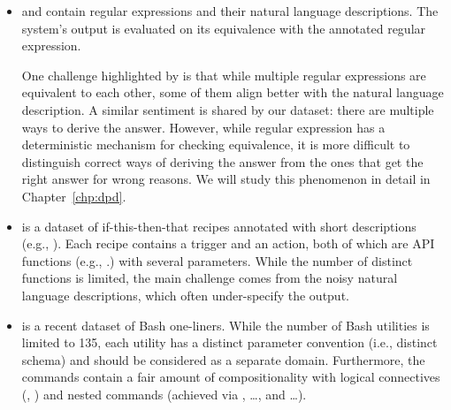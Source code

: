 \begin{itemize}

\item {} \cite{kushman2013regex}
and  \cite{locascio2016regex}
contain regular expressions and 
their natural language descriptions.
The system's output is evaluated on its equivalence with
the annotated regular expression.

One challenge highlighted by \citet{kushman2013regex}
is that while multiple
regular expressions are equivalent to each other,
some of them align better with the
natural language description.
A similar sentiment is shared by our dataset:
there are multiple ways to derive the answer.
However, while regular expression has a deterministic
mechanism for checking equivalence,
it is more difficult to distinguish correct ways
of deriving the answer from the ones that get
the right answer for wrong reasons.
We will study this phenomenon in detail in
Chapter~\ref{chp:dpd}.

\item {} \cite{quirk2015language}
is a dataset of if-this-then-that recipes
annotated with short descriptions
(e.g., ).
Each recipe contains a trigger and an action,
both of which are API functions
(e.g., .)
with several parameters.
While the number of distinct functions is limited,
the main challenge comes from the
noisy natural language descriptions,
which often under-specify the output.

\item {} \cite{lin2018nl2bash}
is a recent dataset of Bash one-liners.
While the number of Bash utilities is limited to 135,
each utility has a distinct parameter convention (i.e., distinct schema)
and should be considered as a separate domain.
Furthermore,
the commands contain a fair amount of compositionality
with logical connectives (\T{\&\&}, \T{||})
and nested commands (achieved via \T{|}, \T{\$(}\dots\T{)}, and \T{<(}\dots\T{)}).





\end{itemize}
